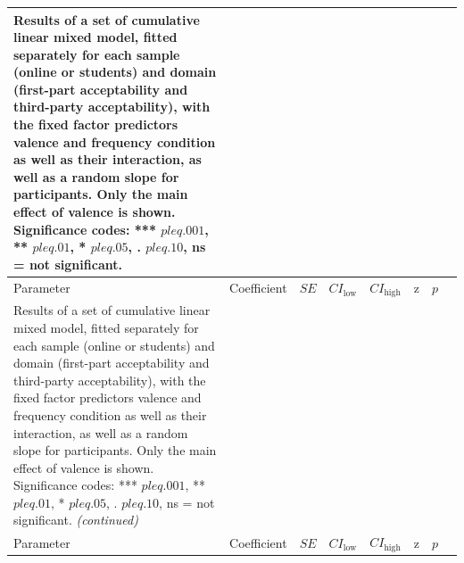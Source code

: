 \documentclass[
]{article}
\begin{document}
\begin{longtable}[t]{lrrrrrrl}
\caption{\label{tab:clmm-raw-effects-of-valency2}Results of a set of cumulative linear mixed model, fitted separately for each sample (online or students) and domain (first-part acceptability and third-party acceptability), with the fixed factor predictors valence and frequency condition as well as their interaction, as well as a random slope for participants. Only the main effect of valence is shown. Significance codes: *** $p \\leq .001$, ** $p \\leq .01$, * $p \\leq .05$, . $p \\leq .10$, ns = not significant.}\\
\toprule
Parameter & Coefficient & $\mathit{SE}$ & $CI_{\text{low}}$ & $CI_{\text{high}}$ & z & $p$ &  \\
\midrule
\endfirsthead
\caption[]{\label{tab:clmm-raw-effects-of-valency2}Results of a set of cumulative linear mixed model, fitted separately for each sample (online or students) and domain (first-part acceptability and third-party acceptability), with the fixed factor predictors valence and frequency condition as well as their interaction, as well as a random slope for participants. Only the main effect of valence is shown. Significance codes: *** $p \\leq .001$, ** $p \\leq .01$, * $p \\leq .05$, . $p \\leq .10$, ns = not significant. \textit{(continued)}}\\
\toprule
Parameter & Coefficient & $\mathit{SE}$ & $CI_{\text{low}}$ & $CI_{\text{high}}$ & z & $p$ &  \\
\midrule
\endhead


\end{longtable}
\end{document}

